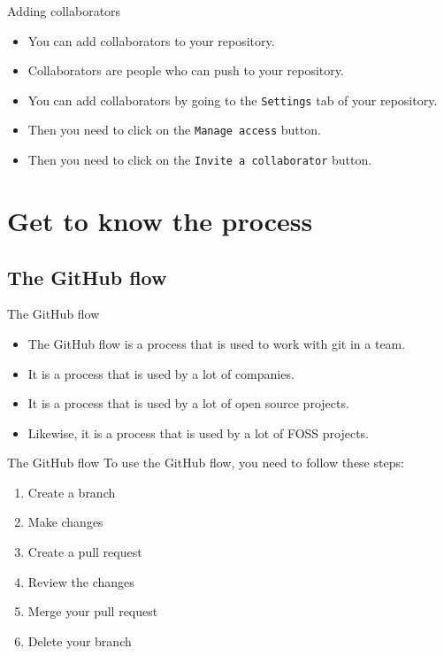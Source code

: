 \documentclass{beamer}
\begin{document}
\begin{frame}{Adding collaborators}
    \begin{itemize}
        \item You can add collaborators to your repository.
        \item Collaborators are people who can push to your repository.
        \item You can add collaborators by going to the \texttt{Settings} tab of your repository.
        \item Then you need to click on the \texttt{Manage access} button.
        \item Then you need to click on the \texttt{Invite a collaborator} button.
    \end{itemize}
\end{frame}

\section{Get to know the process}

\subsection{The GitHub flow}

\begin{frame}{The GitHub flow}
    \begin{itemize}
        \item The GitHub flow is a process that is used to work with git in a team.
        \item It is a process that is used by a lot of companies.
        \item It is a process that is used by a lot of open source projects.
        \item Likewise, it is a process that is used by a lot of FOSS projects.
    \end{itemize}
\end{frame}

\begin{frame}{The GitHub flow}
    To use the GitHub flow, you need to follow these steps:
    \begin{enumerate}
        \item Create a branch
        \item Make changes
        \item Create a pull request
        \item Review the changes
        \item Merge your pull request
        \item Delete your branch
    \end{enumerate}
\end{frame}
\end{document}
